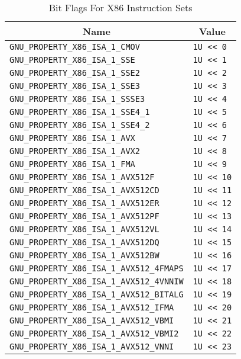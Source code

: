 \begin{table}[H]
\Hrule
  \caption{Bit Flags For X86 Instruction Sets}
  \begin{center}
    \begin{tabular}[t]{l|l}
      \multicolumn{1}{c}{Name} & \multicolumn{1}{c}{Value} \\
      \hline
     \texttt{GNU_PROPERTY_X86_ISA_1_CMOV} & \texttt{1U << 0} \\
     \texttt{GNU_PROPERTY_X86_ISA_1_SSE} & \texttt{1U << 1} \\
     \texttt{GNU_PROPERTY_X86_ISA_1_SSE2} & \texttt{1U << 2} \\
     \texttt{GNU_PROPERTY_X86_ISA_1_SSE3} & \texttt{1U << 3} \\
     \texttt{GNU_PROPERTY_X86_ISA_1_SSSE3} & \texttt{1U << 4} \\
     \texttt{GNU_PROPERTY_X86_ISA_1_SSE4_1} & \texttt{1U << 5} \\
     \texttt{GNU_PROPERTY_X86_ISA_1_SSE4_2} & \texttt{1U << 6} \\
     \texttt{GNU_PROPERTY_X86_ISA_1_AVX} & \texttt{1U << 7} \\
     \texttt{GNU_PROPERTY_X86_ISA_1_AVX2} & \texttt{1U << 8} \\
     \texttt{GNU_PROPERTY_X86_ISA_1_FMA} & \texttt{1U << 9} \\
     \texttt{GNU_PROPERTY_X86_ISA_1_AVX512F} & \texttt{1U << 10} \\
     \texttt{GNU_PROPERTY_X86_ISA_1_AVX512CD} & \texttt{1U << 11} \\
     \texttt{GNU_PROPERTY_X86_ISA_1_AVX512ER} & \texttt{1U << 12} \\
     \texttt{GNU_PROPERTY_X86_ISA_1_AVX512PF} & \texttt{1U << 13} \\
     \texttt{GNU_PROPERTY_X86_ISA_1_AVX512VL} & \texttt{1U << 14} \\
     \texttt{GNU_PROPERTY_X86_ISA_1_AVX512DQ} & \texttt{1U << 15} \\
     \texttt{GNU_PROPERTY_X86_ISA_1_AVX512BW} & \texttt{1U << 16} \\
     \texttt{GNU_PROPERTY_X86_ISA_1_AVX512_4FMAPS} & \texttt{1U << 17} \\
     \texttt{GNU_PROPERTY_X86_ISA_1_AVX512_4VNNIW} & \texttt{1U << 18} \\
     \texttt{GNU_PROPERTY_X86_ISA_1_AVX512_BITALG} & \texttt{1U << 19} \\
     \texttt{GNU_PROPERTY_X86_ISA_1_AVX512_IFMA} & \texttt{1U << 20} \\
     \texttt{GNU_PROPERTY_X86_ISA_1_AVX512_VBMI} & \texttt{1U << 21} \\
     \texttt{GNU_PROPERTY_X86_ISA_1_AVX512_VBMI2} & \texttt{1U << 22} \\
     \texttt{GNU_PROPERTY_X86_ISA_1_AVX512_VNNI} & \texttt{1U << 23} \\
    \cline{1-2}
    \end{tabular}
  \end{center}
\end{table}

